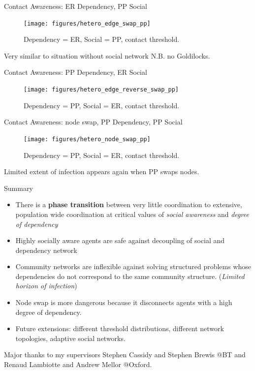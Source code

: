 \documentclass[10pt, xcolor=dvipsnames, handout]{beamer}
\begin{document}
\begin{frame}{Contact Awareness: ER Dependency, PP Social}
\begin{figure}
\centering
\texttt{[image: figures/hetero\_edge\_swap\_pp]}
\caption{Dependency = ER, Social = PP, contact threshold.}
\end{figure}
Very similar to situation without social network N.B. no Goldilocks.

\end{frame}

\begin{frame}{Contact Awareness: PP Dependency, ER Social}
\begin{figure}
\centering
\texttt{[image: figures/hetero\_edge\_reverse\_swap\_pp]}
\caption{Dependency = PP, Social = ER, contact threshold.}
\end{figure}
\end{frame}


\begin{frame}{Contact Awareness: node swap, PP Dependency, PP Social}
\begin{figure}
\centering
\texttt{[image: figures/hetero\_node\_swap\_pp]}
\caption{Dependency = PP, Social = ER, contact threshold.}
\end{figure}
Limited extent of infection appears again when PP swaps nodes.
\end{frame}



\begin{frame}{Summary}
\begin{itemize}
\item There is a \textbf{phase transition} between very little coordination to extensive, population wide coordination at critical values of \emph{social awareness} and \emph{degree of dependency}
\item Highly socially aware agents are safe against decoupling of social and dependency network
\item Community networks are inflexible against solving structured problems whose dependencies do not correspond to the same community structure. (\emph{Limited horizon of infection})
\item Node swap is more dangerous because it disconnects agents with a high degree of dependency.
\item Future extensions: different threshold distributions, different network topologies, adaptive social networks.
\end{itemize}
\end{frame}

\begin{frame}[standout]
Major thanks to my supervisors Stephen Cassidy and Stephen Brewis @BT and Renaud Lambiotte and Andrew Mellor @Oxford.
\end{frame}
\begin{frame}[t,allowframebreaks]
\printbibliography
\end{frame}
\end{document}
